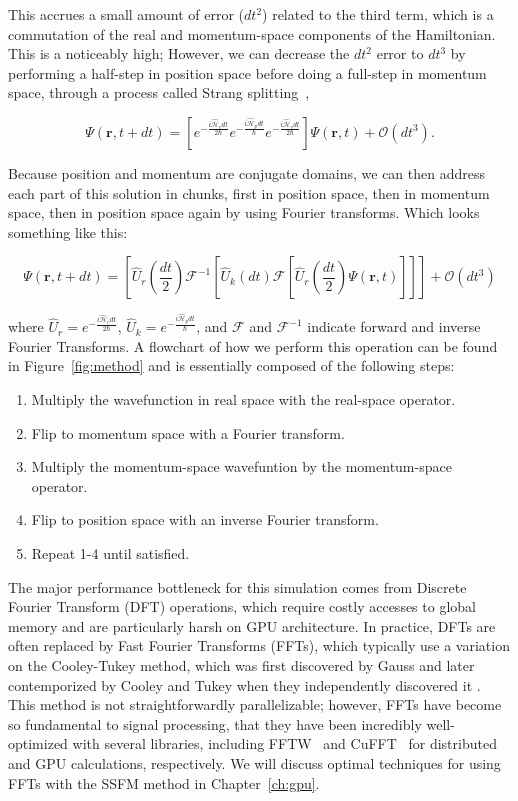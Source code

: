 \noindent This accrues a small amount of error ($dt^2$) related to the third term, which is a commutation of the real and momentum-space components of the Hamiltonian.
This is a noticeably high;
However, we can decrease the $dt^2$ error to $dt^3$ by performing a half-step in position space before doing a full-step in momentum space, through a process called Strang splitting~\cite{strang1968},

$$
\Psi(\mathbf{r},t+dt) = \left[e^{-\frac{i\mathcal{\hat{H}}_vdt}{2\hbar}}e^{-\frac{i\mathcal{\hat{H}}_pdt}{\hbar}}e^{-\frac{i\mathcal{\hat{H}}_vdt}{2\hbar}} \right]\Psi(\mathbf{r},t) + \mathcal{O}(dt^3).
$$

\noindent Because position and momentum are conjugate domains, we can then address each part of this solution in chunks, first in position space, then in momentum space, then in position space again by using Fourier transforms.
Which looks something like this:

$$
\Psi(\mathbf{r}, t+dt) = \left[\hat{U}_r\left(\frac{dt}{2}\right)\mathcal{F}^{-1}\left[\hat{U}_k(dt) \mathcal{F} \left[\hat{U}_r\left(\frac{dt}{2}\right) \Psi(\mathbf{r},t) \right] \right] \right] + \mathcal{O}(dt^3)
$$

where $\hat{U}_r = e^{-\frac{i\mathcal{\hat{H}}_vdt}{2\hbar}}$, $\hat{U}_k = e^{-\frac{i\mathcal{\hat{H}}_pdt}{\hbar}}$, and $\mathcal{F}$ and $\mathcal{F}^{-1}$ indicate forward and inverse Fourier Transforms.
A flowchart of how we perform this operation can be found in Figure~\ref{fig:method} and is essentially composed of the following steps:

\begin{enumerate}
\item Multiply the wavefunction in real space with the real-space operator.
\item Flip to momentum space with a Fourier transform.
\item Multiply the momentum-space wavefuntion by the momentum-space operator.
\item Flip to position space with an inverse Fourier transform.
\item Repeat 1-4 until satisfied.
\end{enumerate}

The major performance bottleneck for this simulation comes from Discrete Fourier Transform (DFT) operations, which require costly accesses to global memory and are particularly harsh on GPU architecture.
In practice, DFTs are often replaced by Fast Fourier Transforms (FFTs), which typically use a variation on the Cooley-Tukey method, which was first discovered by Gauss and later contemporized by Cooley and Tukey when they independently discovered it \cite{cooley1965}.
This method is not straightforwardly parallelizable; however, FFTs have become so fundamental to signal processing, that they have been incredibly well-optimized with several libraries, including FFTW~\cite{frigo1998} and CuFFT~\cite{fatica2008} for distributed and GPU calculations, respectively.
We will discuss optimal techniques for using FFTs with the SSFM method in Chapter~\ref{ch:gpu}.

